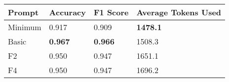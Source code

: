 \begin{tabular}{llll}
\toprule
Prompt & Accuracy & F1 Score & Average Tokens Used \\
\midrule
Minimum & 0.917 & 0.909 & \textbf{1478.1} \\
Basic & \textbf{0.967} & \textbf{0.966} & 1508.3 \\
F2 & 0.950 & 0.947 & 1651.1 \\
F4 & 0.950 & 0.947 & 1696.2 \\
\bottomrule
\end{tabular}
